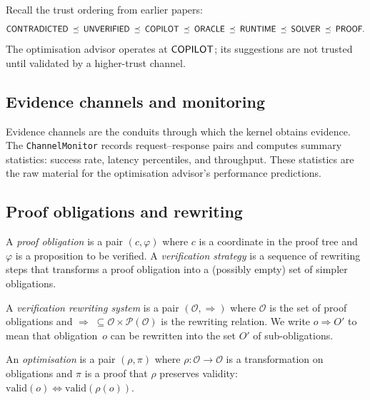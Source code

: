 \documentclass[11pt]{article}
\begin{document}
Recall the trust ordering from earlier papers:
\[
  \mathsf{CONTRADICTED} \;\preceq\; \mathsf{UNVERIFIED} \;\preceq\; \mathsf{COPILOT}
  \;\preceq\; \mathsf{ORACLE} \;\preceq\; \mathsf{RUNTIME}
  \;\preceq\; \mathsf{SOLVER} \;\preceq\; \mathsf{PROOF}.
\]
The optimisation advisor operates at $\mathsf{COPILOT}$; its
suggestions are not trusted until validated by a
higher-trust channel.

\subsection{Evidence channels and monitoring}

Evidence channels are the conduits through which the
kernel obtains evidence.  The \texttt{ChannelMonitor}
records request--response pairs and computes summary
statistics: success rate, latency percentiles, and
throughput.  These statistics are the raw material
for the optimisation advisor's performance predictions.

\subsection{Proof obligations and rewriting}

A \emph{proof obligation} is a pair $(c, \varphi)$
where $c$ is a coordinate in the proof tree and
$\varphi$ is a proposition to be verified.  A
\emph{verification strategy} is a sequence of
rewriting steps that transforms a proof obligation
into a (possibly empty) set of simpler obligations.

\begin{definition}\label{def:rewrite}
A \emph{verification rewriting system} is a pair
$(\mathcal{O}, \Rightarrow)$ where $\mathcal{O}$
is the set of proof obligations and
$\Rightarrow \;\subseteq \mathcal{O} \times
\mathcal{P}(\mathcal{O})$ is the rewriting relation.
We write $o \Rightarrow O'$ to mean that obligation~$o$
can be rewritten into the set $O'$ of sub-obligations.
\end{definition}

\begin{definition}[Optimisation]\label{def:optimisation}
An \emph{optimisation} is a pair $(\rho, \pi)$ where
$\rho \colon \mathcal{O} \to \mathcal{O}$ is a
transformation on obligations and $\pi$ is a proof
that $\rho$ preserves validity:
$\mathrm{valid}(o) \iff \mathrm{valid}(\rho(o))$.
\end{definition}

\end{document}
